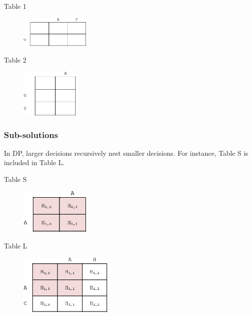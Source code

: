 \begin{multicols}{2}
Table 1
\begin{figure}[H]
  \centering
      \includegraphics[width=0.3\textwidth]{fig02/global_alignment_exercise_1.png}
\end{figure}

\vfill\null
\columnbreak

Table 2
\begin{figure}[H]
  \centering
      \includegraphics[width=0.25\textwidth]{fig02/global_alignment_exercise_2.png}
\end{figure}

\end{multicols} 

%
%
\subsubsection*{Sub-solutions}

In DP, larger decisions recursively nest smaller decisions. For instance, Table S is included in Table L.

\begin{multicols}{2}
Table S
\begin{figure}[H]
  \centering
      \includegraphics[width=0.3\textwidth]{fig02/dynamic_programmoing_subsolution_S.png}
\end{figure}

\vfill\null
\columnbreak

Table L
\begin{figure}[H]
  \centering
      \includegraphics[width=0.4\textwidth]{fig02/dynamic_programmoing_subsolution_L.png}
\end{figure}

\end{multicols} 

